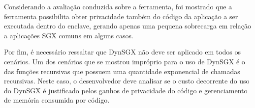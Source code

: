 Considerando a avaliação conduzida sobre a ferramenta, foi mostrado que a
ferramenta possibilita obter privacidade também do código da aplicação a ser
executada dentro do enclave, gerando apenas uma pequena sobrecarga em relação a
aplicações SGX comuns em alguns casos.

Por fim, é necessário ressaltar que DynSGX não deve ser aplicado em todos os
cenários. Um dos cenários que se mostrou impróprio para o uso de DynSGX é o das
funções recursivas que possuem uma quantidade exponencial de chamadas recursivas.
Neste caso, o desenvolvedor deve analisar se o custo decorrente do uso do DynSGX
é justificado pelos ganhos de privacidade do código e gerenciamento de memória
consumida por código.